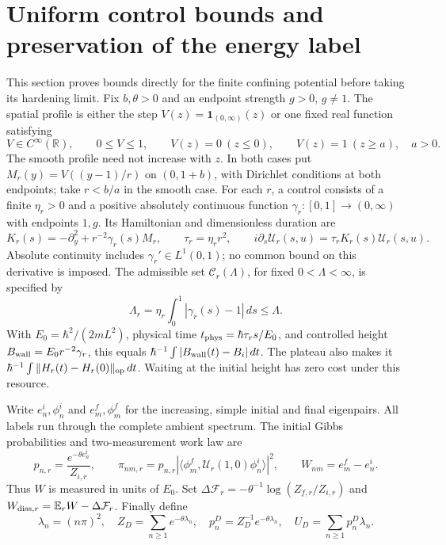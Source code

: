 \documentclass[aps,prl,reprint,superscriptaddress,longbibliography]{revtex4-2}
\begin{document}
\section{Uniform control bounds and preservation of the energy label}
\label{sc:section}

This section proves bounds directly for the finite confining potential before
taking its hardening limit. Fix $b,\theta>0$ and an endpoint strength
$g>0$, $g\ne1$. The spatial profile is either the step
$V(z)=\mathbf 1_{(0,\infty)}(z)$ or one fixed real function satisfying
\begin{equation}
 V\in C^\infty(\mathbb R),\qquad 0\le V\le1,\qquad
 V(z)=0\ (z\le0),\qquad V(z)=1\ (z\ge a),
 \quad a>0.
 \label{sc:profile}
\end{equation}
The smooth profile need not increase with $z$. In both cases put
$M_r(y)=V((y-1)/r)$ on $(0,1+b)$, with Dirichlet conditions at both
endpoints; take $r<b/a$ in the smooth case. For each $r$, a control consists
of a finite $\eta_r>0$ and a positive absolutely continuous function
$\gamma_r:[0,1]\to(0,\infty)$ with endpoints $1,g$. Its Hamiltonian and
dimensionless duration are
\begin{equation}
 K_r(s)=-\partial_y^2+r^{-2}\gamma_r(s)M_r,
 \qquad \tau_r=\eta_r r^2,
 \qquad i\partial_s\mathcal U_r(s,u)=\tau_rK_r(s)\mathcal U_r(s,u).
 \label{sc:model}
\end{equation}
Absolute continuity includes $\gamma_r'\in L^1(0,1)$; no common bound
on this derivative is imposed. The admissible set $\mathcal C_r(\Lambda)$,
for fixed $0<\Lambda<\infty$, is specified by
\begin{equation}
 \Lambda_r=\eta_r\int_0^1|\gamma_r(s)-1|\,ds\le\Lambda.
 \label{sc:action}
\end{equation}
With $E_0=\hbar^2/(2mL^2)$, physical time
$t_{\rm phys}=\hbar\tau_r s/E_0$, and controlled height
$B_{\rm wall}=E_0r^{-2}\gamma_r$, this equals
$\hbar^{-1}\int|B_{\rm wall}(t)-B_i|\,dt$. The plateau also makes it
$\hbar^{-1}\int\|H_r(t)-H_r(0)\|_{\rm op}\,dt$.
Waiting at the initial height has zero cost under this resource.

Write $e_n^i,\phi_n^i$ and $e_m^f,\phi_m^f$ for the increasing, simple
initial and final eigenpairs. All labels run through the complete ambient
spectrum. The initial Gibbs probabilities and two-measurement work law are
\begin{equation}
 p_{n,r}=\frac{e^{-\theta e_n^i}}{Z_{i,r}},\qquad
 \pi_{nm,r}=p_{n,r}|\langle\phi_m^f,\mathcal U_r(1,0)\phi_n^i\rangle|^2,
 \qquad W_{nm}=e_m^f-e_n^i.
 \label{sc:tpm}
\end{equation}
Thus $W$ is measured in units of $E_0$. Set
$\Delta\mathcal F_r=-\theta^{-1}\log(Z_{f,r}/Z_{i,r})$ and
$W_{{\rm diss},r}=\mathbb E_rW-\Delta\mathcal F_r$. Finally define
\begin{equation}
 \lambda_n=(n\pi)^2,\quad
 Z_D=\sum_{n\ge1}e^{-\theta\lambda_n},\quad
 p_n^D=Z_D^{-1}e^{-\theta\lambda_n},\quad
 U_D=\sum_{n\ge1}p_n^D\lambda_n.
 \label{sc:dirichlet}
\end{equation}
\end{document}
